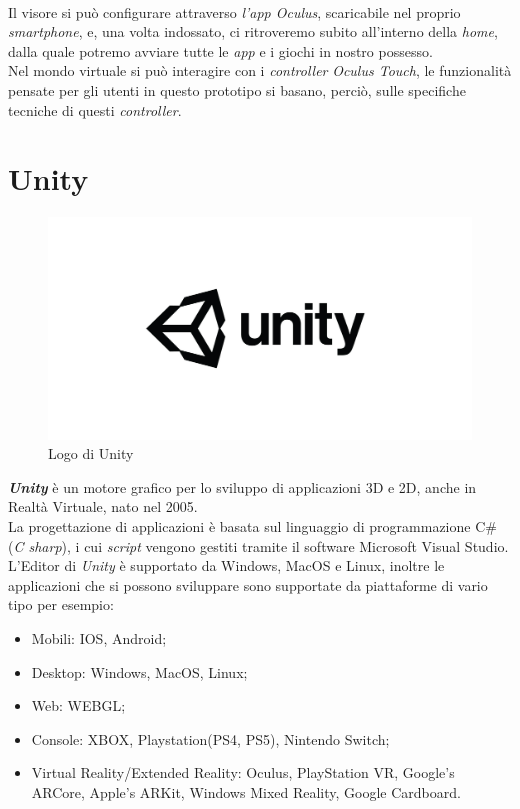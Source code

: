 \\Il visore si può configurare attraverso \textit{l'app Oculus}, scaricabile nel proprio \textit{smartphone}, e, una volta indossato, ci ritroveremo subito all'interno della \textit{home}, dalla quale potremo avviare tutte le \textit{app} e i giochi in nostro possesso. 
\\Nel mondo virtuale si può interagire con i \textit{controller} \textit{Oculus Touch}, le funzionalità pensate per gli utenti in questo prototipo si basano, perciò, sulle specifiche tecniche di questi \textit{controller}.
\section{Unity}
\begin{figure}[H]
    \centering
    \includegraphics[scale = 0.2]{Immagini/ogimg.jpg}
    \caption{Logo di Unity}
    \label{fig:my_label}
\end{figure} 
\textbf{\textit{Unity}}\cite{unity} è un motore grafico per lo sviluppo di applicazioni 3D e 2D, anche in Realtà Virtuale, nato nel 2005.\\La progettazione di applicazioni è basata sul linguaggio di programmazione C\#(\textit{C sharp}), i cui \textit{\gls{script}} vengono gestiti tramite il software Microsoft Visual Studio.\\L'Editor di \textit{Unity} è supportato da Windows, MacOS e Linux, inoltre le applicazioni che si possono sviluppare sono supportate da piattaforme di vario tipo per esempio:
\begin{itemize}
    \item Mobili: IOS, Android;
    \item Desktop: Windows, MacOS, Linux;
    \item Web: WEBGL;
    \item Console: XBOX, Playstation(PS4, PS5), Nintendo Switch;
    \item Virtual Reality/Extended Reality: Oculus, PlayStation VR, Google's ARCore, Apple's ARKit, Windows Mixed Reality, Google Cardboard.
\end{itemize}
